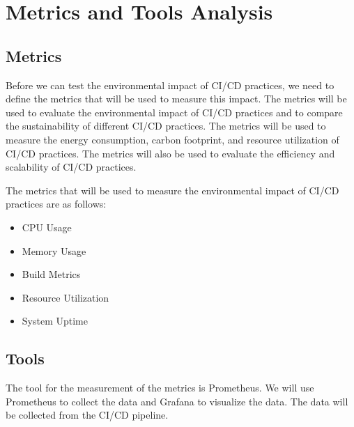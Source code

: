 
\chapter{Metrics and Tools Analysis}%
\label{ch:metrics}

\section{Metrics}%
\label{sec:metrics}
Before we can test the environmental impact of CI/CD practices, we need to define the metrics that will be used to measure this impact. The metrics will be used to evaluate the environmental impact of CI/CD practices and to compare the sustainability of different CI/CD practices. The metrics will be used to measure the energy consumption, carbon footprint, and resource utilization of CI/CD practices. The metrics will also be used to evaluate the efficiency and scalability of CI/CD practices.

The metrics that will be used to measure the environmental impact of CI/CD practices are as follows:
\begin{itemize}
    \item CPU Usage
    \item Memory Usage
    \item Build Metrics
    \item Resource Utilization
    \item System Uptime
\end{itemize}


\section{Tools}%
\label{sec:tools}
The tool for the measurement of the metrics is Prometheus. We will use Prometheus to collect the data and Grafana to visualize the data. The data will be collected from the CI/CD pipeline.

